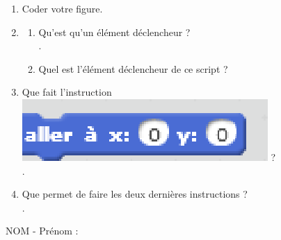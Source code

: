 \documentclass[12pt,a4paper]{article}
\begin{document}
\begin{enumerate} [1{)}]
\item
Coder votre figure. \vspace{3pt}
\item
\begin{enumerate} [a{)}]
\item
Qu'est qu'un élément déclencheur ? \, \dotfill \vspace{9pt} \\
.\dotfill \vspace{9pt}
\item
Quel est l'élément déclencheur de ce script ? \dotfill  \vspace{9pt} \\
\end{enumerate}
\item
Que fait l'instruction \includegraphics[scale=0.5]{Evaluation1_a.eps} ? \dotfill  \vspace{9pt} \\
.\dotfill \vspace{9pt} \\
\item
Que permet de faire les deux dernières instructions ? \dotfill  \vspace{9pt} \\
.\dotfill \vspace{9pt} \\
\end{enumerate}
\vfill
NOM - Prénom : \dotfill 
\end{document}
